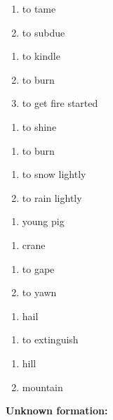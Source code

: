 \begin{enumerate}
\item to tame
\item to subdue
\end{enumerate}
\begin{enumerate}
\item to kindle
\item to burn
\item to get fire started
\end{enumerate}
\begin{enumerate}
\item to shine
\end{enumerate}
\begin{enumerate}
\item to burn
\end{enumerate}
\begin{enumerate}
\item to snow lightly
\item to rain lightly
\end{enumerate}
\begin{enumerate}
\item young pig
\end{enumerate}
\begin{enumerate}
\item crane
\end{enumerate}
\begin{enumerate}
\item to gape
\item to yawn
\end{enumerate}
\begin{enumerate}
\item hail
\end{enumerate}
\begin{enumerate}
\item to extinguish
\end{enumerate}
\begin{enumerate}
\item hill
\item mountain
\end{enumerate}
\noindent\textbf{Unknown formation:}\\

